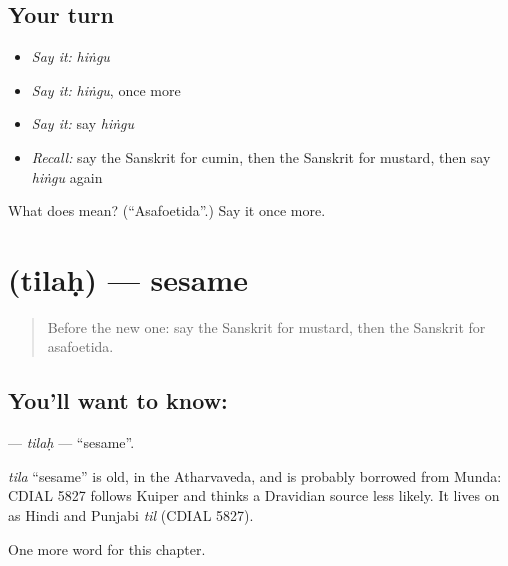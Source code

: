 \subsection*{Your turn}
\begin{itemize}
\raggedright
  \item \emph{Say it:} \emph{hiṅgu}
  \item \emph{Say it:} \emph{hiṅgu}, once more
  \item \emph{Say it:} say \emph{hiṅgu}
  \item \emph{Recall:} say the Sanskrit for cumin, then the Sanskrit for mustard, then say \emph{hiṅgu} again
\end{itemize}

\begin{tcolorbox}[breakable,colback=teal!4,colframe=teal!35!black,title={Before you move on}]
What does  mean? (\textquotedblleft{}Asafoetida\textquotedblright{}.) Say it once more.
\end{tcolorbox}
\section[\texorpdfstring{\sk{तिलः} (tilaḥ)}{तिलः (tilaḥ)}]{ (tilaḥ) — sesame}

\label{lesson:SA-C159-tilah}



\begin{quote}
Before the new one: say the Sanskrit for mustard, then the Sanskrit for asafoetida.
\end{quote}

\subsection*{You'll want to know: }
\textbf{} — \emph{tilaḥ} — \textquotedblleft{}sesame\textquotedblright{}.

\begin{cousinweb}
\emph{tila} \textquotedblleft{}sesame\textquotedblright{} is old, in the Atharvaveda, and is probably borrowed from Munda: CDIAL 5827 follows Kuiper and thinks a Dravidian source less likely. It lives on as Hindi and Punjabi \emph{til} (CDIAL 5827).
\end{cousinweb}

\begin{grammarlens}[title={What you've built}]
One more word for this chapter.
\end{grammarlens}

